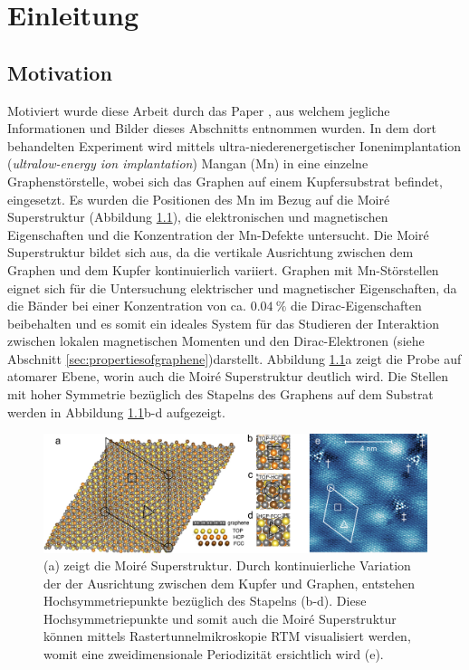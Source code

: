\chapter{Einleitung}
\section{Motivation}
\label{sec:motivation}
Motiviert wurde diese Arbeit durch das Paper \cite{doi:10.1021/acsnano.1c00139}, aus welchem jegliche Informationen und Bilder dieses 
Abschnitts entnommen wurden.
In dem dort behandelten Experiment wird mittels ultra-niederenergetischer Ionenimplantation
(\textit{ultralow-energy ion implantation}) Mangan (Mn) in eine einzelne Graphenstörstelle, wobei sich das Graphen auf einem Kupfersubstrat befindet, eingesetzt.
Es wurden die Positionen des Mn im Bezug auf die Moiré Superstruktur (Abbildung \ref{fig:ascnano_structure}), die elektronischen und magnetischen Eigenschaften und die Konzentration der Mn-Defekte
untersucht.
Die Moiré Superstruktur bildet sich aus, da die vertikale Ausrichtung zwischen dem Graphen und dem Kupfer kontinuierlich variiert.
Graphen mit Mn-Störstellen eignet sich für die Untersuchung elektrischer und magnetischer Eigenschaften, da die Bänder bei einer Konzentration von ca. $\qty{0.04}{\percent}$ 
die Dirac-Eigenschaften beibehalten und es somit ein ideales System für das Studieren der Interaktion
zwischen lokalen magnetischen Momenten und den Dirac-Elektronen (siehe Abschnitt \ref{sec:propertiesofgraphene})darstellt.
Abbildung \ref{fig:ascnano_structure}a zeigt die Probe auf atomarer Ebene, worin auch die Moiré Superstruktur deutlich wird.
Die Stellen mit hoher Symmetrie bezüglich des Stapelns des Graphens auf dem Substrat werden in 
Abbildung \ref{fig:ascnano_structure}b-d aufgezeigt.
\begin{figure}
    \centering
    \includegraphics[width = \textwidth]{Plots/images_large_nn1c00139_0002.jpeg}
    \caption{(a) zeigt die Moiré Superstruktur. Durch kontinuierliche Variation der der Ausrichtung 
    zwischen dem Kupfer und Graphen, entstehen Hochsymmetriepunkte bezüglich des Stapelns (b-d).
    Diese Hochsymmetriepunkte und somit auch die Moiré Superstruktur können mittels Rastertunnelmikroskopie RTM 
    visualisiert werden, womit eine zweidimensionale Periodizität ersichtlich wird (e).}
    \label{fig:ascnano_structure}
\end{figure}
